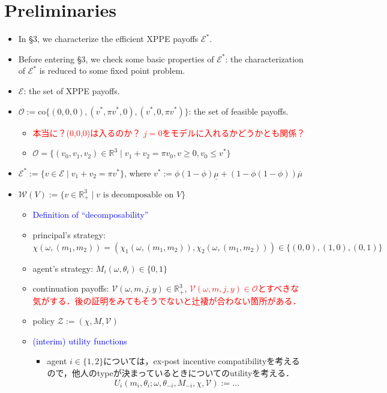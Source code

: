 \documentclass[11pt,a4paper,dvipdfmx]{article}
\newcommand{\R}{\mathbb{R}}
\newcommand{\mE}{\mathcal{E}}
\newcommand{\mO}{\mathcal{O}}
\newcommand{\mV}{\mathcal{V}}
\newcommand{\mW}{\mathcal{W}}
\newcommand{\mZ}{\mathcal{Z}}
\renewcommand{\bar}{\overline}
\newcommand{\1}{\mathbbm{1}}
\newcommand{\kcomment}[1]{{\textcolor{blue}{#1}}}
\newcommand{\ocomment}[1]{{\textcolor{red}{#1}}}
\begin{document}
\section*{Preliminaries}

\begin{itemize}
	\item In \S3, we characterize the efficient XPPE payoffs $\mE^*$.
	\item Before entering \S3, we check some basic properties of $\mE^*$: the characterization of $\mE^*$ is reduced to some fixed point problem.
	\item $\mE$: the set of XPPE payoffs.
	\item $\mO:= \text{co} \{(0,0,0), (v^*, \pi v^*, 0), (v^*, 0, \pi v^*)\}$: the set of feasible payoffs. 
	\begin{itemize}
		\item \ocomment{本当に？(0,0,0)は入るのか？ $j=0$をモデルに入れるかどうかとも関係？}
		\item $\mO = \{(v_0, v_1, v_2) \in \R^3 \mid v_1 + v_2 = \pi v_0, v \geq 0, v_0 \leq v^*\}$ 
	\end{itemize}
	\item $\mE^* := \{v \in \mE \mid v_1 + v_2 = \pi v^*\}$, where $v^* := \phi (1 - \phi) \underline{\mu} + (1 - \phi (1 - \phi)) \bar{\mu}$
	\item $\mW(V) := \{v \in \R_+^3 \mid v \text{ is decomposable on } V \}$
	\begin{itemize}
		\item \kcomment{Definition of ``decomposability''}
		\item principal's strategy: $\chi(\omega, (m_1, m_2)) = (\chi_1(\omega, (m_1, m_2)), \chi_2(\omega, (m_1, m_2)))\in \{(0,0), (1,0), (0,1)\}$
		\item agent's strategy: $M_{i}(\omega, \theta_i) \in \{0,1\}$
		\item continuation payoffs: $\mV(\omega, m, j, y) \in \R_+^3$, \ocomment{$\mV(\omega, m, j, y) \in \mO$とすべきな気がする．後の証明をみてもそうでないと辻褄が合わない箇所がある．}
		\item policy $\mZ := (\chi, M, \mV)$
		\item \kcomment{(interim) utility functions}
		\begin{itemize}
			\item agent $i \in \{1,2\}$については，ex-post incentive compatibilityを考えるので，他人のtypeが決まっているときについてのutilityを考える．
			$$
			U_i(m_i, \theta_i; \omega, \theta_{-i}, M_{-i}, \chi, \mV) := \dots
$$
\end{itemize}
\end{itemize}
\end{itemize}
\end{document}
